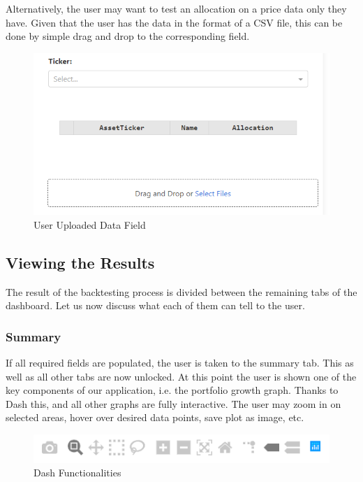 \documentclass[main.tex]{subfiles}
\begin{document}
Alternatively, the user may want to test an allocation on a price data only they have. Given that the user has the data in the format of a CSV file, this can be done by simple drag and drop to the corresponding field. 


\begin{figure}[H]
   \centering
   \includegraphics[scale=0.6]{08Appendices/081User/081Pictures/user_csv.png}
   \caption{User Uploaded Data Field}
\end{figure}

\subsection{Viewing the Results}

The result of the backtesting process is divided between the remaining tabs of the dashboard. Let us now discuss what each of them can tell to the user.

\subsubsection{Summary}


If all required fields are populated, the user is taken to the summary tab. This as well as all other tabs are now unlocked. At this point the user is shown one of the key components of our application, i.e. the portfolio growth graph. Thanks to Dash this, and all other graphs are fully interactive. The user may zoom in on selected areas, hover over desired data points, save plot as image, etc.



\begin{figure}[H]

   \centering

   \includegraphics[width=\textwidth]{08Appendices/081User/081Pictures/dash_funcionalities.png}

   \caption{Dash Functionalities}

   \label{dash_functionalities}

\end{figure}
\end{document}
